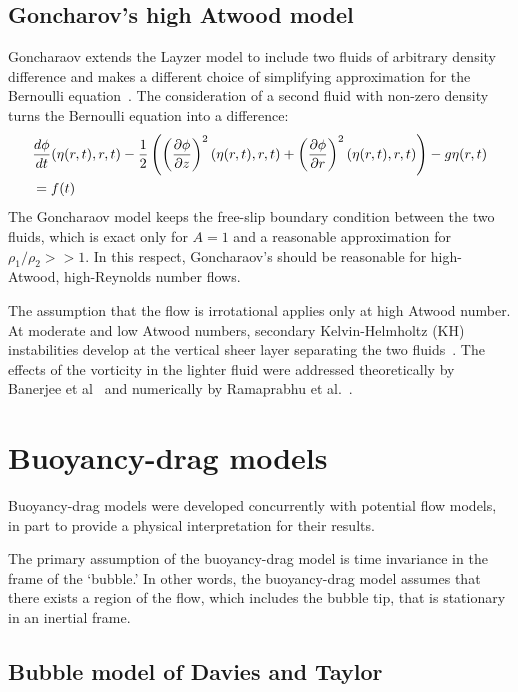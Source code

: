 \subsection{Goncharov's high Atwood model}

Goncharaov extends the Layzer model to include two fluids of arbitrary density difference and makes a different choice of simplifying approximation for the Bernoulli equation~\cite{Goncharaov2002}.
The consideration of a second fluid with non-zero density turns the Bernoulli equation  into a difference:
\begin{equation} \label{eqn:GonBernoulli}
\begin{aligned}
&\frac{d \phi}{d t}(\eta(r,t), r, t) - \frac{1}{2} \left(\left(\frac{\partial \phi}{\partial z}\right)^2(\eta(r,t), r, t) +\left(\frac{\partial \phi}{\partial r}\right)^2(\eta(r,t), r, t)\right) - g \eta(r,t) \\
&= f(t) \\
\end{aligned}
\end{equation}
The Goncharaov model keeps the free-slip boundary condition between the two fluids, which is exact only for $A = 1$ and a reasonable approximation for $\rho_1 / \rho_2 >> 1$.
In this respect, Goncharaov's should be reasonable for high-Atwood, high-Reynolds number flows.

The assumption that the flow is irrotational applies only at high Atwood number.
At moderate and low Atwood numbers, secondary Kelvin-Helmholtz (KH) instabilities develop at the vertical sheer layer separating the two fluids~\cite{Ramaprabhu2006,Wilkinson2007}.
The effects of the vorticity in the lighter fluid were addressed theoretically by Banerjee et al~\cite{Banerjee2011} and numerically by Ramaprabhu et al.~\cite{Ramaprabhu2012}.


\section{Buoyancy-drag models}

Buoyancy-drag models were developed concurrently with potential flow models, in part to provide a physical interpretation for their results.

The primary assumption of the buoyancy-drag model is time invariance in the frame of the `bubble.'
In other words, the buoyancy-drag model assumes that there exists a region of the flow, which includes the bubble tip, that is stationary in an inertial frame.

\subsection{Bubble model of Davies and Taylor}

